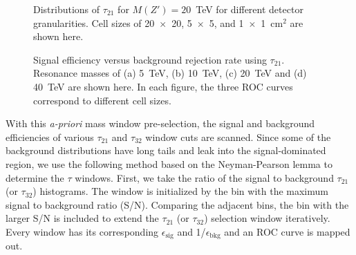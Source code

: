 \begin{figure}
\begin{center}
\end{center}
\caption{Distributions of $\tau_{21}$ for $M(Z') = 20$~TeV for different 
detector granularities. Cell sizes of 20~$\times$~20, 5~$\times$~5, and 1~$\times$~1~cm$^2$ 
are shown here. \label{fig:Rawhit_05GeV_tau21_Dis}}
\end{figure}

\begin{figure}
\begin{center}
\end{center}
\caption{Signal efficiency versus background rejection rate using $\tau_{21}$.
Resonance masses of (a) 5~TeV, (b) 10~TeV, (c) 20~TeV and (d) 40~TeV are shown 
here. 
In each figure, the three ROC curves correspond to different cell sizes.
\label{fig:Rawhit_05GeV_tau21_ROC}
}
\end{figure}

With this {\it a-priori} mass window pre-selection, the signal and background efficiencies of 
various $\tau_{21}$ and $\tau_{32}$ window cuts are scanned. 
Since some of the background distributions have long tails and leak into the 
signal-dominated region, we use the following method based on the 
Neyman-Pearson lemma to determine the $\tau$ windows. 
First, we take the ratio of the signal to background $\tau_{21}$ (or $\tau_{32}$) 
histograms. The window is initialized by the bin with the maximum signal to 
background ratio (S/N).  
Comparing the adjacent bins,  the bin with the larger S/N is included  to extend the $\tau_{21}$ (or $\tau_{32}$) 
selection window iteratively.  Every window has its corresponding $\epsilon_\mathrm{sig}$ and 
1/$\epsilon_\mathrm{bkg}$ and an ROC curve is mapped out. 

